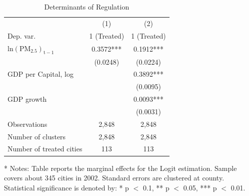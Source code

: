\documentclass[12pt]{article}
\begin{document}
          \begin{table}[H]\centering
    \caption{Determinants of Regulation} \label{tab:treat}
    \footnotesize
    \begin{tabular}{l*{2}{c}}
      \hline\hline
      &\multicolumn{1}{c}{(1)}&\multicolumn{1}{c}{(2)}\\
      Dep. var. &\multicolumn{1}{c}{1 (Treated)}&\multicolumn{1}{c}{1 (Treated)}\\
      \hline
      $\mathrm{ln(PM_{2.5})_{t-1}}$     &0.3572***&0.1912***\\
                                        &(0.0248) &(0.0224)\\
      GDP per Capital, log  &&0.3892***\\
                            &&(0.0095)\\
      GDP growth          &&0.0093***\\
                            &&(0.0031)\\                 

      Observations	           &2,848&2,848 \\
      Number of clusters         &2,848 &2,848\\
      Number of treated cities   &113 & 113 \\
      \hline\hline
  \end{tabular}
  \begin{tablenotes}
    \item[*] \small Notes: Table reports the marginal effects for the Logit estimation. Sample covers about 345 cities in 2002. Standard errors are clustered at county. Statistical significance is denoted by: * p $<$ 0.1, ** p $<$ 0.05, *** p $<$ 0.01.
  \end{tablenotes}
  \end{table}
\end{document}
